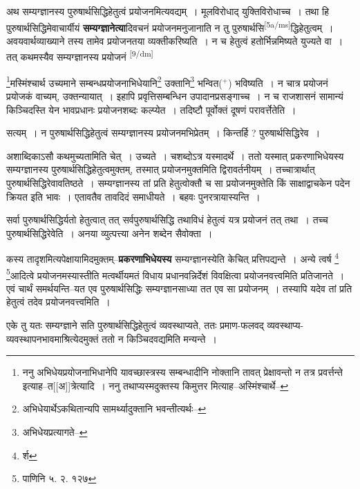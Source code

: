 \documentclass[article,12pt,a4paper]{memoir}
\newcommand{\add}[1]{($^{+}$#1)}
\begin{document}
	  \pstart अथ सम्यग्ज्ञानस्य पुरुषार्थसिद्धिहेतुत्वं प्रयोजनमित्यवद्यम् । मूलविरोधाद् युक्तिविरोधाच्च । तथा हि पुरुषार्थसिद्धिमेवाचार्यीयं \textbf{सम्यग्ज्ञानेत्या}दिवचनं प्रयोजनमनुजानाति न तु पुरुषार्थसि\leavevmode\textsuperscript{\rmlatinfont\tiny [5a/ms]}द्धिहेतुत्वम् । अवयवार्थव्याख्याने तस्य तामेव प्रयोजनतया व्यक्तीकरिष्यति । न च हेतुत्वं हतोर्भिन्नमिष्यते युज्यते वा । तत् कथमस्यैव सम्यग्ज्ञानस्य प्रयोजनं  \leavevmode\textsuperscript{\rmlatinfont\tiny [9/dm]} 
	  
	\footnote{ननु अभिधेयप्रयोजनाभिधानेपि यावच्छास्त्रस्य सम्बन्धादीनि नोक्तानि तावत् प्रेक्षावन्तो न तत्र प्रवर्त्तन्ते इत्याह--त[[अ]]त्रेत्यादि । ननु तथाप्यस्मदुक्तस्य किमुत्तर मित्याह--अस्मिंश्चार्थे--\cite{dp-msD-n}}मस्मिंश्चार्थ उच्यमाने सम्बन्धप्रयोजनाभिधेयानि\footnote{अभिधेयार्थेऽकथितान्यपि सामर्थ्यादुक्तानि भवन्तीत्यर्थः--\cite{dp-msD-n}} उक्तानि\footnote{अभिधेयप्रत्यागते--} भन्वित\add{} भविष्यति । न चात्र प्रयोजनं प्रयोजकं वाच्यम्, उक्तन्यायात् । इहापि प्रवृत्तिसम्बन्धिन उपादानप्रसङ्गाच्च । न च राजशासनं सामान्यं किञ्चिदस्ति येन भावप्रधानः प्रयोजनशब्दः कल्प्येत । तदिष्टौ पूर्वोक्तं दूषणं परावर्त्तेतेति ।
	\pend
      

	  \pstart सत्यम् । न पुरुषार्थसिद्धिहेतुत्वं सम्यग्ज्ञानस्य प्रयोजनमभिप्रेतम् । किन्तर्हि ? पुरुषार्थसिद्धिरेव ।
	\pend
      

	  \pstart अशाब्दिकाऽसौ कथमुच्यतामिति चेत् । उच्यते । चशब्दोऽत्र यस्मादर्थे । ततो यस्मात् प्रकरणाभिधेयस्य सम्यग्ज्ञानस्य पुरुषार्थसिद्धिहेतुत्वमुक्तम्, तस्मात् प्रयोजनमुक्तमिति द्विरावर्तनीयम् । तच्चात्रार्थात् पुरुषार्थसिद्धिरेवावतिष्ठते । सम्यग्ज्ञानस्य तां प्रति हेतुत्वोक्तौ च सा प्रयोजनमुक्तेति किं साक्षाद्वाचकेन पदेन क्रियत इति भावः । एतावतैव तावदिदं समाधीयते । बहवः पुनरत्रायास्यन्ति ।
	\pend
      

	  \pstart सर्वा पुरुषार्थसिद्धिर्यतो हेतुत्वात् तत् सर्वपुरुषार्थसिद्धि तथाविधं हेतुत्वं यत्र प्रयोजनं तत् तथा । तच्च पुरुषार्थसिद्धिरेवेति । अनया व्युत्पत्त्या अनेन शब्देन सैवोक्ता ।
	\pend
      

	  \pstart कस्य तादृशमित्यपेक्षायामिदमुक्तम्--\textbf{प्रकरणाभिधेयस्य} सम्यग्ज्ञानस्येति केचित् प्रत्तिपद्यन्ते । अन्ये त्वर्ष \footnote{र्श} \footnote{पाणिनि \cite{dp-msD-n} ५. २. १२७}आदित्वे प्रयोजनमस्यास्तीति मत्वर्थीयमतं विधाय प्रधानवन्निर्देशं विवक्षित्वा प्रयोजनवत्त्वमिति प्रतिजानते । एवं चार्थं समर्थयन्ति--यत एव पुरुषार्थसिद्धिः सम्यग्ज्ञानसाध्या तत एव सा प्रयोजनम् । तस्यापि यदेव तां प्रति हेतुत्वं तदेव प्रयोजनवत्त्वमिति ।
	\pend
      

	  \pstart एके तु यतः सम्यग्ज्ञाने सति पुरुषार्थसिद्धिहेतुत्वं व्यवस्थाप्यते, ततः प्रमाण-फलवद् व्यवस्थाप्य-व्यवस्थापनभावमाश्रित्येदमुक्तं ततो न किञ्चिदवद्यमिति मन्यन्ते ।
	\pend
      
\end{document}
